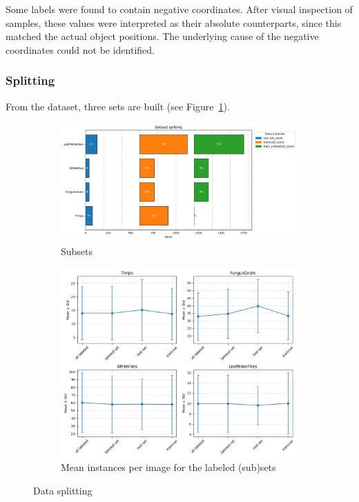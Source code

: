\documentclass[12pt,a4paper]{article}
\begin{document}
Some labels were found to contain negative coordinates. After visual inspection of samples, these values were interpreted as their absolute counterparts, since this matched the actual object positions. The underlying cause of the negative coordinates could not be identified.

\subsubsection{Splitting}

From the dataset, three sets are built (see Figure~\ref{fig:split}). 

\begin{figure}[H]
    \centering
    \begin{subfigure}{0.45\textwidth}
        \centering
        \includegraphics[width=\linewidth]{images/dataset_splitting.png}
        \caption{Subsets}
        \label{fig:split}
    \end{subfigure}
    \hfill
    \begin{subfigure}{0.45\textwidth}
        \centering
        \includegraphics[width=\linewidth]{images/labeled_sets.png}
        \caption{Mean instances per image for the labeled (sub)sets}
        \label{fig:mean_labels}
    \end{subfigure}
    
    \caption{Data splitting}
    \label{fig:dataset_splitting}
\end{figure}
\end{document}
